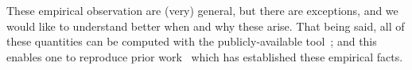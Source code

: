 \noindent
These empirical observation are (very) general, but there are exceptions, and we would like to understand better when and why these arise.
%
That being said, all of these quantities can be computed with the publicly-available \WW tool~\cite{weightwatcher_package}; and this enables one to reproduce prior work~\cite{MM18_TR_JMLRversion,MM20a_trends_NatComm,MM21a_simpsons_TR,YTHx22_TR,YTHx23_KDD} which has established these empirical facts.



